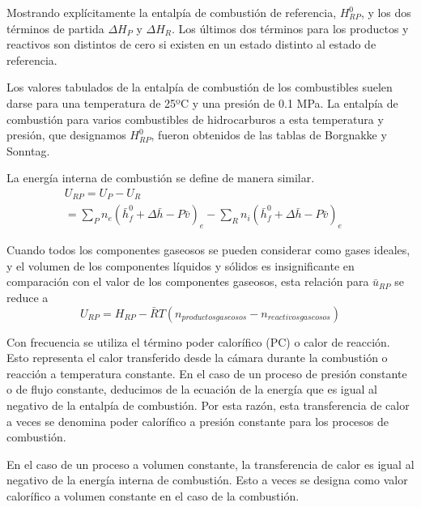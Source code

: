 \par Mostrando explícitamente la entalpía de combustión de referencia, $H^0_{RP}$, y los dos términos de partida $\Delta H_{P}$ y $\Delta H_{R}$. Los últimos dos términos para los productos y reactivos son distintos de cero si existen en un estado distinto al estado de referencia.
\par Los valores tabulados de la entalpía de combustión de los combustibles suelen darse para una temperatura de 25ºC y una presión de 0.1 MPa. La entalpía de combustión para varios combustibles de hidrocarburos a esta temperatura y presión, que designamos $H^0_{RP}$, fueron obtenidos de las tablas de Borgnakke y Sonntag\cite{bib:vanwylen}.
\par La energía interna de combustión se define de manera similar.
\begin{equation}
\begin{gathered}
    U_{RP} = U_{P} - U_{R} \quad\quad\quad\quad\quad
    \quad\quad\quad\quad\quad\quad\quad\quad\quad\quad\quad\quad\quad\quad\\
    = \sum_P n_e (\bar h^0_{f} + \Delta \bar h - P\bar v)_{e} - \sum_R n_i (\bar h^0_{f} + \Delta \bar h - P\bar v)_{e}
\end{gathered}
\end{equation}
\par Cuando todos los componentes gaseosos se pueden considerar como gases ideales, y el volumen de los componentes líquidos y sólidos es insignificante en comparación con el valor de los componentes gaseosos, esta relación para $\bar u_{RP}$ se reduce a
\begin{equation}
        U_{RP} = H_{RP} - \bar RT (n_{productos gaseosos} - n_{reactivos gaseosos})
\end{equation}
\par Con frecuencia se utiliza el término poder calorífico (PC) o calor de reacción. Esto representa el calor transferido desde la cámara durante la combustión o reacción a temperatura constante. En el caso de un proceso de presión constante o de flujo constante, deducimos de la ecuación de la energía que es igual al negativo de la entalpía de combustión. Por esta razón, esta transferencia de calor a veces se denomina poder calorífico a presión constante para los procesos de combustión.
\par En el caso de un proceso a volumen constante, la transferencia de calor es igual al negativo de la energía interna de combustión. Esto a veces se designa como valor calorífico a volumen constante en el caso de la combustión.
